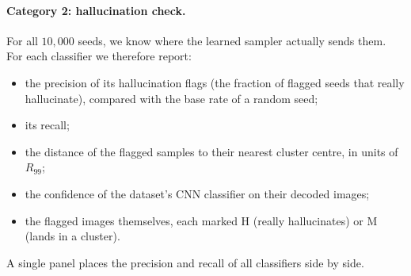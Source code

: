 \documentclass[11pt]{article}
\begin{document}
\paragraph{Category 2: hallucination check.}
For all $10{,}000$ seeds, we know where the learned sampler actually sends them. For each
classifier we therefore report:
\begin{itemize}
    \item the precision of its hallucination flags (the fraction of flagged seeds that really
    hallucinate), compared with the base rate of a random seed;
    \item its recall;
    \item the distance of the flagged samples to their nearest cluster centre, in units of $R_{99}$;
    \item the confidence of the dataset's CNN classifier on their decoded images;
    \item the flagged images themselves, each marked H (really hallucinates) or M (lands in a cluster).
\end{itemize}
A single panel places the precision and recall of all classifiers side by side.

\endgroup
\end{document}
